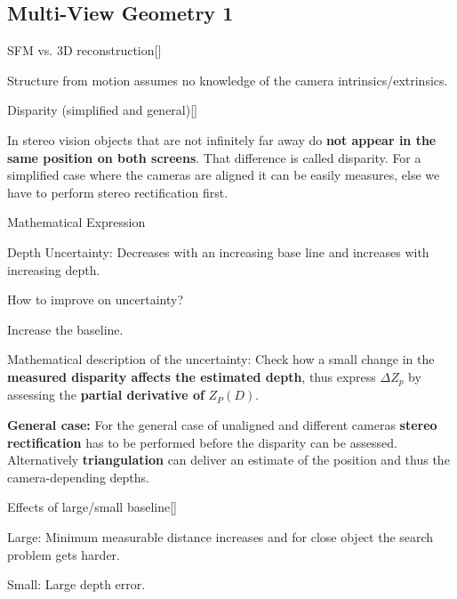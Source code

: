\documentclass[10pt,a4paper]{scrartcl}
\begin{document}
\begin{multicols*}{2}
\subsection*{Multi-View Geometry 1}

\begin{QandA}
{SFM vs. 3D reconstruction}[\Comparison]
\item Structure from motion assumes no knowledge of the camera intrinsics/extrinsics.
\end{QandA}
	
\begin{QandA}
{Disparity (simplified and general)}[\Definition]
\item In stereo vision objects that are not infinitely far away do \textbf{not appear in the same position on both screens}. That difference is called disparity. For a simplified case where the cameras are aligned it can be easily measures, else we have to perform stereo rectification first.
\item Mathematical Expression


\item Depth Uncertainty: Decreases with an increasing base line and increases with increasing depth.

\item How to improve on uncertainty?

Increase the baseline.

\item Mathematical description of the uncertainty: Check how a small change in the \textbf{measured disparity affects the estimated depth}, thus express $\Delta Z_p$ by assessing the \textbf{partial derivative of} $Z_P(D)$.

\item \textbf{General case:} For the general case of unaligned and different cameras \textbf{stereo rectification} has to be performed before the disparity can be assessed. Alternatively \textbf{triangulation} can deliver an estimate of the position and thus the camera-depending depths.
\end{QandA}

\begin{QandA}
{Effects of large/small baseline}[\Comparison]
\item Large: Minimum measurable distance increases and for close object the search problem gets harder.
\item Small: Large depth error.
\end{QandA}


\end{multicols*}
\end{document}
